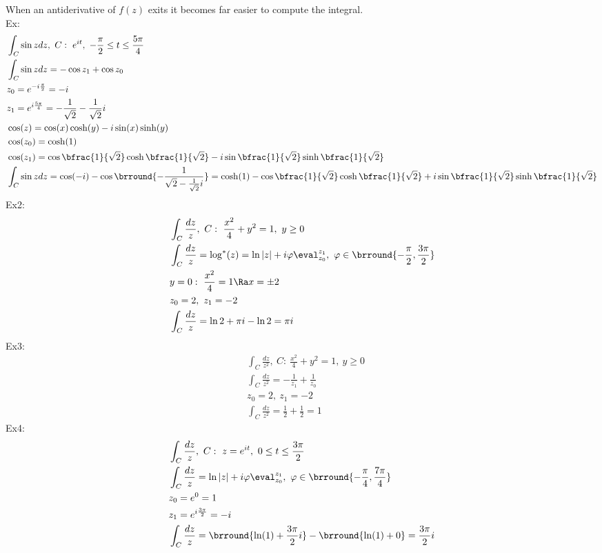 When an antiderivative of $f(z)$ exits it becomes far easier to compute the integral.\\
Ex:
\begin{align*}
    &\int_C\sin zdz,\ C:\ e^{it},\ -\frac{\pi}{2}\leq t\leq \frac{5\pi}{4}\\
    &\int_C\sin z dz= -\cos z_1+\cos z_0\\
    &z_0=e^{-i\frac{\pi}{2}}=-i\\
    &z_1=e^{i\frac{5\pi}{4}}=-\frac{1}{\sqrt{2}}-\frac{1}{\sqrt{2}}i\\
    &\cos(z)=\cos(x)\cosh(y)-i\sin(x)\sinh(y)\\
    &\cos(z_0)=\cosh(1)\\
    &\cos(z_1)=\cos\bfrac{1}{\sqrt{2}}\cosh\bfrac{1}{\sqrt{2}}-i\sin\bfrac{1}{\sqrt{2}}\sinh\bfrac{1}{\sqrt{2}}\\
    &\int_C\sin zdz=\cos(-i)-\cos\brround{-\frac{1}{\sqrt{2}-\frac{1}{\sqrt{2}}i}}=\cosh(1)-\cos\bfrac{1}{\sqrt{2}}\cosh\bfrac{1}{\sqrt{2}}+i\sin\bfrac{1}{\sqrt{2}}\sinh\bfrac{1}{\sqrt{2}}
\end{align*}
Ex2:
\begin{align*}
    &\int_C\frac{dz}{z},\ C:\ \frac{x^2}{4}+y^2=1,\ y\geq0\\
    &\int_C\frac{dz}{z}=\log^*(z)=\ln|z|+i\varphi\eval_{z_0}^{z_1},\ \varphi\in\brround{-\frac{\pi}{2},\frac{3\pi}{2}}\\
    &y=0:\ \frac{x^2}{4}=1\Ra x=\pm2\\
    &z_0=2,\ z_1=-2\\
    &\int_C\frac{dz}{z}=\ln2+\pi i-\ln2=\pi i
\end{align*}
Ex3:
\begin{align*}
    &\int_C\frac{dz}{z^2},\ C:\ \frac{x^2}{4}+y^2=1,\ y\geq0\\
    &\int_C\frac{dz}{z^2}=-\frac{1}{z_1}+\frac{1}{z_0}\\
    &z_0=2,\ z_1=-2\\
    &\int_C\frac{dz}{z^2}=\frac{1}{2}+\frac{1}{2}=1
\end{align*}
Ex4:
\begin{align*}
    &\int_C\frac{dz}{z},\ C:\ z=e^{it},\ 0\leq t\leq \frac{3\pi}{2}\\
    &\int_C\frac{dz}{z}=\ln|z|+i\varphi\eval_{z_0}^{z_1},\ \varphi\in\brround{-\frac{\pi}{4},\frac{7\pi}{4}}\\
    &z_0=e^{0}=1\\
    &z_1=e^{i\frac{3\pi}{2}}=-i\\
    &\int_C\frac{dz}{z}=\brround{\ln(1)+\frac{3\pi}{2}i}-\brround{\ln(1)+0}=\frac{3\pi}{2}i
\end{align*}
